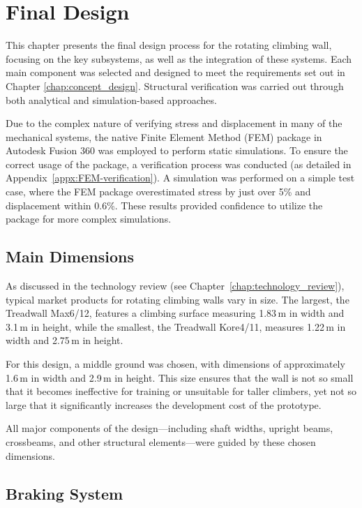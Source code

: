\chapter{Final Design}
\label{chap:detailed_design}

This chapter presents the final design process for the rotating climbing wall, focusing on the key subsystems, as well as the integration of these systems. Each main component was selected and designed to meet the requirements set out in Chapter \ref{chap:concept_design}. Structural verification was carried out through both analytical and simulation-based approaches.

Due to the complex nature of verifying stress and displacement in many of the mechanical systems, the native Finite Element Method (FEM) package in Autodesk Fusion 360 was employed to perform static simulations. To ensure the correct usage of the package, a verification process was conducted (as detailed in Appendix~\ref{appx:FEM-verification}). A simulation was performed on a simple test case, where the FEM package overestimated stress by just over 5\% and displacement within 0.6\%. These results provided confidence to utilize the package for more complex simulations.

\section{Main Dimensions}

As discussed in the technology review (see Chapter~\ref{chap:technology_review}), typical market products for rotating climbing walls vary in size. The largest, the Treadwall Max6/12, features a climbing surface measuring 1.83\,m in width and 3.1\,m in height, while the smallest, the Treadwall Kore4/11, measures 1.22\,m in width and 2.75\,m in height.

For this design, a middle ground was chosen, with dimensions of approximately 1.6\,m in width and 2.9\,m in height. This size ensures that the wall is not so small that it becomes ineffective for training or unsuitable for taller climbers, yet not so large that it significantly increases the development cost of the prototype.

All major components of the design—including shaft widths, upright beams, crossbeams, and other structural elements—were guided by these chosen dimensions.

\section{Braking System}

